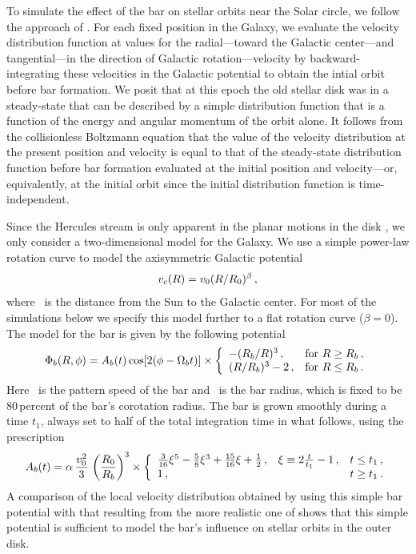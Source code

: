 To simulate the effect of the bar on stellar orbits near the Solar
circle, we follow the approach of \citet{dehnen00a}. For each fixed
position in the Galaxy, we evaluate the velocity distribution function
at values for the radial---toward the Galactic center---and
tangential---in the direction of Galactic rotation---velocity by
backward-integrating these velocities in the Galactic potential to
obtain the intial orbit before bar formation. We posit that at this
epoch the old stellar disk was in a steady-state that can be described
by a simple distribution function that is a function of the energy and
angular momentum of the orbit alone. It follows from the collisionless
Boltzmann equation that the value of the velocity distribution at the
present position and velocity is equal to that of the steady-state
distribution function before bar formation evaluated at the initial
position and velocity---or, equivalently, at the initial orbit since
the initial distribution function is time-independent.

Since the Hercules stream is only apparent in the planar motions in
the disk \citep[\eg,][]{Bovyveldist}, we only consider a two-dimensional
model for the Galaxy. We use a simple power-law rotation curve to
model the axisymmetric Galactic potential
\begin{equation}
v_c(R) = v_0(R/R_0)^\beta \,,
\end{equation}
where \Ro\ is the distance from the Sun to the Galactic center. For
most of the simulations below we specify this model further to a flat
rotation curve ($\beta = 0$). The model for the bar is given by the
following potential
\begin{equation}
\Phi_b(R,\phi) = A_b(t) \cos [2(\phi - \Omega_b t)] \times
\left\{ \begin{array}{ll} -(R_b/R)^3\,, & \mathrm{for}\ R \geq
  R_b\,,\\ (R/R_b)^3-2\,, & \mathrm{for}\ R \leq R_b\,. \end{array}
\right.
\end{equation}
Here \Omegab\ is the pattern speed of the bar and \Rb\ is the bar
radius, which is fixed to be 80\,percent of the bar's corotation
radius. The bar is grown smoothly during a time $t_1$, always set to
half of the total integration time in what follows, using the
prescription
\begin{equation}
A_b(t) = \alpha \, \frac{v_0^2}{3}\,\left(\frac{R_0}{R_b}\right)^3
\times \left\{ \begin{array}{lll}
\frac{3}{16}\xi^5 - \frac{5}{8} \xi^3 + \frac{15}{16} \xi + \frac{1}{2}\,, & \xi \equiv 2\frac{t}{t_1}-1\,, & t \leq t_1\,,\\
1\,, & & t \geq t_1\,.\end{array} \right. 
\end{equation}
A comparison of the local velocity distribution obtained by using this
simple bar potential with that resulting from the more realistic one
of \citet{gardner10a} shows that this simple potential is sufficient
to model the bar's influence on stellar orbits in the outer disk.

